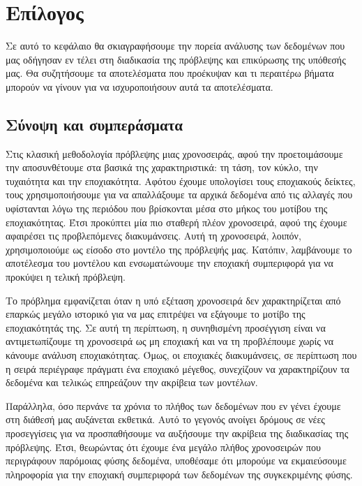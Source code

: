 \chapter{Επίλογος}
\label{chap8}

Σε αυτό το κεφάλαιο θα σκιαγραφήσουμε την πορεία ανάλυσης των δεδομένων που μας οδήγησαν εν τέλει στη διαδικασία της πρόβλεψης και επικύρωσης της υπόθεσής μας. Θα συζητήσουμε τα αποτελέσματα που προέκυψαν και τι περαιτέρω βήματα μπορούν να γίνουν για να ισχυροποιήσουν αυτά τα αποτελέσματα. 

\section{Σύνοψη και συμπεράσματα}

Στις κλασική μεθοδολογία πρόβλεψης μιας χρονοσειράς, αφού την προετοιμάσουμε την αποσυνθέτουμε στα βασικά της χαρακτηριστικά: τη τάση, τον κύκλο, την τυχαιότητα και την εποχιακότητα. Αφότου έχουμε υπολογίσει τους εποχιακούς δείκτες, τους χρησιμοποιήσουμε για να απαλλάξουμε τα αρχικά δεδομένα από τις αλλαγές που υφίστανται λόγω της περιόδου που βρίσκονται μέσα στο μήκος του μοτίβου της εποχιακότητας. Έτσι προκύπτει μία πιο σταθερή πλέον χρονοσειρά, αφού της έχουμε αφαιρέσει τις προβλεπόμενες διακυμάνσεις. Αυτή τη χρονοσειρά, λοιπόν, χρησιμοποιούμε ως είσοδο στο μοντέλο της πρόβλεψής μας. Κατόπιν, λαμβάνουμε το αποτέλεσμα του μοντέλου και ενσωματώνουμε την εποχιακή συμπεριφορά για να προκύψει η τελική πρόβλεψη. 

Το πρόβλημα εμφανίζεται όταν η υπό εξέταση χρονοσειρά δεν χαρακτηρίζεται από επαρκώς μεγάλο ιστορικό για να μας επιτρέψει να εξάγουμε το μοτίβο της εποχιακότητάς της. Σε αυτή τη περίπτωση, η συνηθισμένη προσέγγιση είναι να αντιμετωπίζουμε τη χρονοσειρά ως μη εποχιακή και να τη προβλέπουμε χωρίς να κάνουμε ανάλυση εποχιακότητας. Όμως, οι εποχιακές διακυμάνσεις, σε περίπτωση που η σειρά περιέγραφε πράγματι ένα εποχιακό μέγεθος, συνεχίζουν να χαρακτηρίζουν τα δεδομένα και τελικώς επηρεάζουν την ακρίβεια των μοντέλων.

Παράλληλα, όσο περνάνε τα χρόνια το πλήθος των δεδομένων που εν γένει έχουμε στη διάθεσή μας αυξάνεται εκθετικά. Αυτό το γεγονός ανοίγει δρόμους σε νέες προσεγγίσεις για να προσπαθήσουμε να αυξήσουμε την ακρίβεια της διαδικασίας της πρόβλεψης. Έτσι, θεωρώντας ότι έχουμε ένα μεγάλο πλήθος χρονοσειρών που περιγράφουν παρόμοιας φύσης δεδομένα, υποθέσαμε ότι μπορούμε να εκμαιεύσουμε πληροφορία για την εποχιακή συμπεριφορά των δεδομένων της συγκεκριμένης φύσης.

